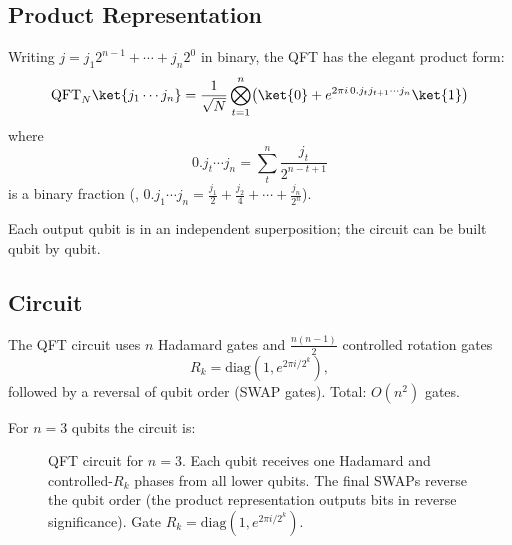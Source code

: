\documentclass[oneside]{academica}
\begin{document}
\subsection{Product Representation}

Writing $j=j_1 2^{n-1}+\cdots+j_n 2^0$ in binary, the QFT has the elegant product form:
\begin{equation*}
  \mathrm{QFT}_N\ket{j_1\cdots j_n}=\frac{1}{\sqrt{N}} \bigotimes_{t=1}^{n}\!\left(\ket{0}+e^{2\pi i\,0.j_t j_{t+1}\cdots j_n}\ket{1}\right)
\end{equation*}
where
\begin{equation*}
  0.j_t \cdots j_n=\sum_t^n \frac{j_t}{2^{n-t+1}}
\end{equation*}
is a binary fraction (\eg, $0.j_1 \cdots j_n = \frac{j_1}{2}+\frac{j_2}{4}+\cdots+\frac{j_n}{2^n}$).

Each output qubit is in an independent superposition; the circuit can be built qubit by qubit.

\subsection{Circuit}

The QFT circuit uses $n$ Hadamard gates and $\displaystyle \frac{n(n-1)}{2}$ controlled rotation gates
\begin{equation*}
  R_k=\text{diag}(1,e^{2\pi i/2^k}),
\end{equation*}
followed by a reversal of qubit order (SWAP gates).
Total: $O(n^2)$ gates.

For $n=3$ qubits the circuit is:
\begin{figure}[H]
  \centering
  \caption{QFT circuit for $n=3$.
    Each qubit receives one Hadamard and controlled-$R_k$ phases from all lower qubits.
    The final SWAPs reverse the qubit order (the product representation outputs bits in reverse significance).
    Gate $R_k=\mathrm{diag}(1,e^{2\pi i/2^k})$.
  }
\end{figure}
\end{document}
